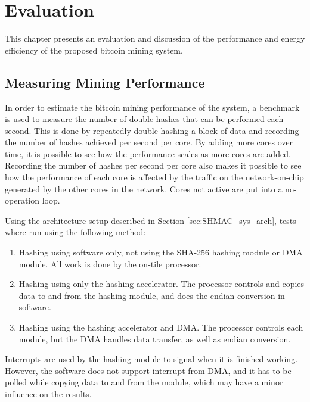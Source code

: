 \chapter{Evaluation}

This chapter presents an evaluation and discussion of the performance and energy efficiency
of the proposed bitcoin mining system.

\section{Measuring Mining Performance}

In order to estimate the bitcoin mining performance of the system, a benchmark is used to
measure the number of double hashes that can be performed each second.
This is done by repeatedly double-hashing a block of data and recording the
number of hashes achieved per second per core. By adding more cores over time, it
is possible to see how the performance scales as more cores are added. Recording
the number of hashes per second per core also makes it possible to see how the performance
of each core is affected by the traffic on the network-on-chip generated by the other
cores in the network. Cores not active are put into a no-operation loop.

Using the architecture setup described in Section \ref{sec:SHMAC_sys_arch}, tests where run using the
following method:

\begin{enumerate}
    \item Hashing using software only, not using the SHA-256 hashing module or DMA module.
    All work is done by the on-tile processor.
    \item Hashing using only the hashing accelerator.
    The processor controls and copies data to and from the hashing module, and does the endian conversion in software.
    \item Hashing using the hashing accelerator and DMA.
    The processor controls each module, but the DMA handles data transfer, as well as endian conversion.
\end{enumerate}

Interrupts are used by the hashing module to signal when it is finished working. However,
the software does not support interrupt from DMA, and it has to be polled while copying data to and from
the module, which may have a minor influence on the results.

